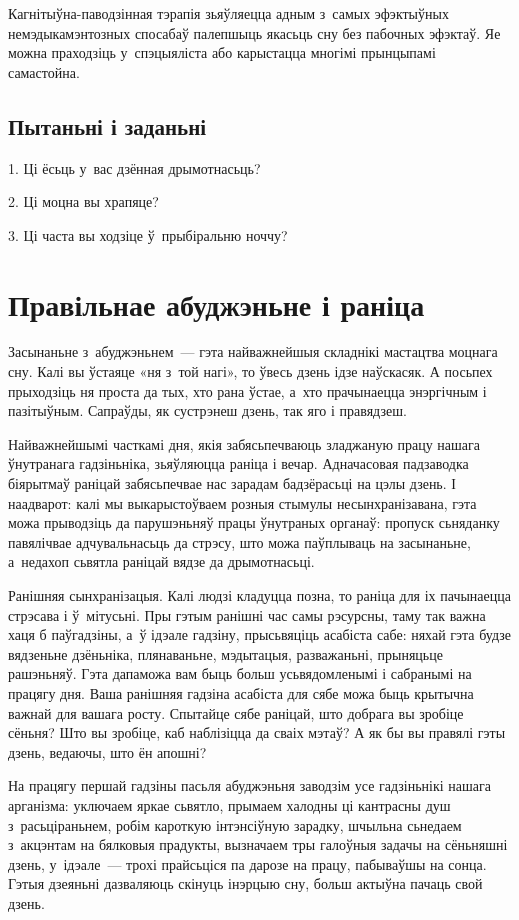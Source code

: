 Кагнітыўна-паводзінная тэрапія зьяўляецца адным з~самых эфэктыўных немэдыкамэнтозных спосабаў палепшыць якасьць сну без пабочных эфэктаў. Яе можна праходзіць у~спэцыяліста або карыстацца многімі прынцыпамі самастойна.

\subsection*{Пытаньні і заданьні}

1. Ці ёсьць у~вас дзённая дрымотнасьць?

2. Ці моцна вы храпяце?

3. Ці часта вы ходзіце ў~прыбіральню ноччу?


\section{Правільнае абуджэньне і раніца}

Засынаньне з~абуджэньнем~--- гэта найважнейшыя складнікі мастацтва моцнага сну. Калі вы ўстаяце «ня з~той нагі», то ўвесь дзень ідзе наўскасяк. А посьпех прыходзіць ня проста да тых, хто рана ўстае, а~хто прачынаецца энэргічным і пазітыўным. Сапраўды, як сустрэнеш дзень, так яго і правядзеш.

Найважнейшымі часткамі дня, якія забясьпечваюць зладжаную працу нашага ўнутранага гадзіньніка, зьяўляюцца раніца і вечар. Адначасовая падзаводка біярытмаў раніцай забясьпечвае нас зарадам бадзёрасьці на цэлы дзень. І наадварот: калі мы выкарыстоўваем розныя стымулы несынхранізавана, гэта можа прыводзіць да парушэньняў працы ўнутраных органаў: пропуск сьняданку павялічвае адчувальнасьць да стрэсу, што можа паўплываць на засынаньне, а~недахоп сьвятла раніцай вядзе да дрымотнасьці.

Ранішняя сынхранізацыя. Калі людзі кладуцца позна, то раніца для іх пачынаецца стрэсава і ў~мітусьні. Пры гэтым ранішні час самы рэсурсны, таму так важна хаця б паўгадзіны, а~ў ідэале гадзіну, прысьвяціць асабіста сабе: няхай гэта будзе вядзеньне дзёньніка, плянаваньне, мэдытацыя, разважаньні, прыняцьце рашэньняў. Гэта дапаможа вам быць больш усьвядомленымі і сабранымі на працягу дня. Ваша ранішняя гадзіна асабіста для сябе можа быць крытычна важнай для вашага росту. Спытайце сябе раніцай, што добрага вы зробіце сёньня? Што вы зробіце, каб наблізіцца да сваіх мэтаў? А як бы вы правялі гэты дзень, ведаючы, што ён апошні?

На працягу першай гадзіны пасьля абуджэньня заводзім усе гадзіньнікі нашага арганізма: уключаем яркае сьвятло, прымаем халодны ці кантрасны душ з~расьціраньнем, робім кароткую інтэнсіўную зарадку, шчыльна сьнедаем з~акцэнтам на бялковыя прадукты, вызначаем тры галоўныя задачы на сёньняшні дзень, у~ідэале~--- трохі прайсьціся па дарозе на працу, пабываўшы на сонца. Гэтыя дзеяньні дазваляюць скінуць інэрцыю сну, больш актыўна пачаць свой дзень.

